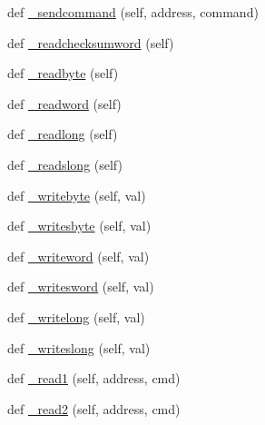 \begin{DoxyCompactItemize}
\item 
def \mbox{\hyperlink{classtoxic__hardware_1_1roboclaw__3_1_1Roboclaw_a90f7346f5ad7ac6e783798a1f755d6e9}{\+\_\+sendcommand}} (self, address, command)
\item 
def \mbox{\hyperlink{classtoxic__hardware_1_1roboclaw__3_1_1Roboclaw_a28d7d81001704ec45abf4ac3067328eb}{\+\_\+readchecksumword}} (self)
\item 
def \mbox{\hyperlink{classtoxic__hardware_1_1roboclaw__3_1_1Roboclaw_aa44404ef49547768501e8a0ac6cb0fcd}{\+\_\+readbyte}} (self)
\item 
def \mbox{\hyperlink{classtoxic__hardware_1_1roboclaw__3_1_1Roboclaw_ab108cec36d976e3c49fbcba8b1406ff3}{\+\_\+readword}} (self)
\item 
def \mbox{\hyperlink{classtoxic__hardware_1_1roboclaw__3_1_1Roboclaw_a8d66ae6d6beb1bb126eb600db81d99ec}{\+\_\+readlong}} (self)
\item 
def \mbox{\hyperlink{classtoxic__hardware_1_1roboclaw__3_1_1Roboclaw_a406e62b0f169ff15d7dd3304b7d18fc3}{\+\_\+readslong}} (self)
\item 
def \mbox{\hyperlink{classtoxic__hardware_1_1roboclaw__3_1_1Roboclaw_a20ef100ec6c3b82b97d4763f61ae785b}{\+\_\+writebyte}} (self, val)
\item 
def \mbox{\hyperlink{classtoxic__hardware_1_1roboclaw__3_1_1Roboclaw_a45ce0518a91d2d3c7bcf75353f0f2362}{\+\_\+writesbyte}} (self, val)
\item 
def \mbox{\hyperlink{classtoxic__hardware_1_1roboclaw__3_1_1Roboclaw_aede49d17f176ee71f8dac86e4d7a41d5}{\+\_\+writeword}} (self, val)
\item 
def \mbox{\hyperlink{classtoxic__hardware_1_1roboclaw__3_1_1Roboclaw_ad8aa9bb8d610b9a0aec769dd6bb83a67}{\+\_\+writesword}} (self, val)
\item 
def \mbox{\hyperlink{classtoxic__hardware_1_1roboclaw__3_1_1Roboclaw_a2f43b35acbde35e3d8584dcc5ca878d3}{\+\_\+writelong}} (self, val)
\item 
def \mbox{\hyperlink{classtoxic__hardware_1_1roboclaw__3_1_1Roboclaw_acaaa45f1f55d2636dbb2caf92b08a2ce}{\+\_\+writeslong}} (self, val)
\item 
def \mbox{\hyperlink{classtoxic__hardware_1_1roboclaw__3_1_1Roboclaw_a37f6c14f4919eada2b0985cd324f523f}{\+\_\+read1}} (self, address, cmd)
\item 
def \mbox{\hyperlink{classtoxic__hardware_1_1roboclaw__3_1_1Roboclaw_a865ec63bfaf45dc74af6fc1738d86551}{\+\_\+read2}} (self, address, cmd)

\end{DoxyCompactItemize}
